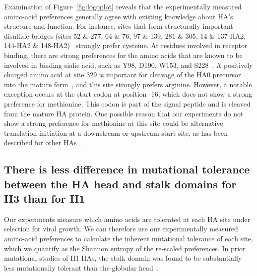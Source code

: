 \documentclass[9pt,twocolumn,twoside]{pnas-new-for-biorxiv}
\begin{document}
Examination of Figure~\ref{fig:logoplot} reveals that the experimentally measured amino-acid preferences generally agree with existing knowledge about HA's structure and function.
For instance, sites that form structurally important disulfide bridges (sites 52 \& 277, 64 \& 76, 97 \& 139, 281 \& 305, 14 \& 137-HA2, 144-HA2 \& 148-HA2)~\cite{waterfield1981disulphide} strongly prefer cysteine.
At residues involved in receptor binding, there are strong preferences for the amino acids that are known to be involved in binding sialic acid, such as Y98, D190, W153, and S228~\cite{weis1988structure,martin1998studies,nobusawa2000change,yang2015structure}.
A positively charged amino acid at site 329 is important for cleavage of the HA0 precursor into the mature form~\cite{stech2005new}, and this site strongly prefers arginine.
However, a notable exception occurs at the start codon at position -16, which does not show a strong preference for methionine.
This codon is part of the signal peptide and is cleaved from the mature HA protein.
One possible reason that our experiments do not show a strong preference for methionine at this site could be alternative translation-initiation at a downstream or upstream start site, as has been described for other HAs~\cite{girard2011upstream}.

\subsection*{There is less difference in mutational tolerance between the HA head and stalk domains for H3 than for H1}
Our experiments measure which amino acids are tolerated at each HA site under selection for viral growth.
We can therefore use our experimentally measured amino-acid preferences to calculate the inherent mutational tolerance of each site, which we quantify as the Shannon entropy of the re-scaled preferences.
In prior mutational studies of H1 HAs, the stalk domain was found to be substantially less mutationally tolerant than the globular head~\cite{thyagarajan2014inherent,wu2014high,doud2016accurate,heaton2013genome}.
\end{document}
